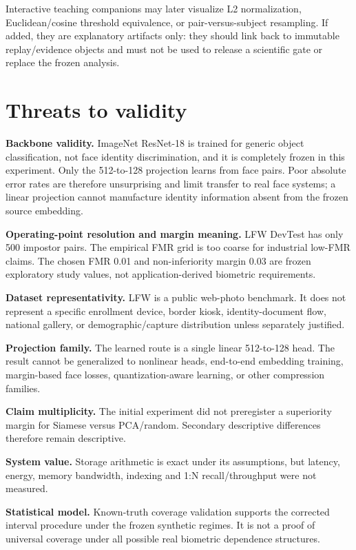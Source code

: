 \documentclass[10pt,a4paper]{article}
\begin{document}
Interactive teaching companions may later visualize L2 normalization, Euclidean/cosine
threshold equivalence, or pair-versus-subject resampling. If added, they are explanatory
artifacts only: they should link back to immutable replay/evidence objects and must not be
used to release a scientific gate or replace the frozen analysis.

\section{Threats to validity}\label{sec:limits}

\textbf{Backbone validity.} ImageNet ResNet-18 is trained for generic object
classification, not face identity discrimination, and it is completely frozen in this
experiment. Only the 512-to-128 projection learns from face pairs. Poor absolute error rates
are therefore unsurprising and limit transfer to real face systems; a linear projection
cannot manufacture identity information absent from the frozen source embedding.

\textbf{Operating-point resolution and margin meaning.} LFW DevTest has only 500
impostor pairs. The empirical FMR grid is too coarse for industrial low-FMR claims. The
chosen FMR 0.01 and non-inferiority margin 0.03 are frozen exploratory study values, not
application-derived biometric requirements.

\textbf{Dataset representativity.} LFW is a public web-photo benchmark. It does not
represent a specific enrollment device, border kiosk, identity-document flow, national
gallery, or demographic/capture distribution unless separately justified.

\textbf{Projection family.} The learned route is a single linear 512-to-128 head. The result
cannot be generalized to nonlinear heads, end-to-end embedding training, margin-based face
losses, quantization-aware learning, or other compression families.

\textbf{Claim multiplicity.} The initial experiment did not preregister a superiority margin
for Siamese versus PCA/random. Secondary descriptive differences therefore remain
descriptive.

\textbf{System value.} Storage arithmetic is exact under its assumptions, but latency,
energy, memory bandwidth, indexing and 1:N recall/throughput were not measured.

\textbf{Statistical model.} Known-truth coverage validation supports the corrected interval
procedure under the frozen synthetic regimes. It is not a proof of universal coverage under
all possible real biometric dependence structures.
\end{document}
